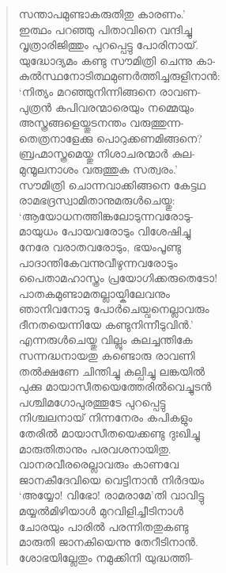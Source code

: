 \begin{verse}
സന്താപമുണ്ടാകരുതിതു കാരണം.’\\
ഇത്ഥം പറഞ്ഞു പിതാവിനെ വന്ദിച്ചു\\
വൃത്രാരിജിത്തും പുറപ്പെട്ടു പോരിനായ്.\\
യുദ്ധോദ്യമം കണ്ടു സൗമിത്രി ചെന്നു കാ-\\
കുല്‍സ്ഥനോടിത്ഥമുണര്‍ത്തിച്ചരുളിനാന്‍:\\
‘നിത്യം മറഞ്ഞുനിന്നിങ്ങനെ രാവണ-\\
പുത്രന്‍ കപിവരന്മാരെയും നമ്മെയും\\
അസ്ത്രങ്ങളെയ്തുടനന്തം വരുത്തുന്ന-\\
തെത്രനാളേക്കു പൊറുക്കണമിങ്ങനെ?\\
ബ്രഹ്മാസ്ത്രമെയ്തു നിശാചരന്മാര്‍ കുല-\\
മുന്മൂലനാശം വരുത്തുക സത്വരം.’\\
സൗമിത്രി ചൊന്നവാക്കിങ്ങനെ കേട്ടഥ\\
രാമഭദ്രസ്വാമിതാനുമരുള്‍ചെയ്തു:\\
‘ആയോധനത്തിങ്കലോടുന്നവരോടു-\\
മായുധം പോയവരോടും വിശേഷിച്ചു\\
നേരേ വരാതവരോടും, ഭയംപൂണ്ടു\\
പാദാന്തികേവന്നുവീഴുന്നവരോടും\\
പൈതാമഹാസ്ത്രം പ്രയോഗിക്കരുതെടോ!\\
പാതകമുണ്ടാമതല്ലായ്കിലേവനും\\
ഞാനിവനോടു പോര്‍ചെയ്വനെല്ലാവരും\\
ദീനതയെന്നിയേ കണ്ടുനിന്നീടുവിന്‍.’\\
എന്നരുള്‍ചെയ്തു വില്ലും കുലച്ചന്തികേ\\
സന്നദ്ധനായതു കണ്ടൊരു രാവണി\\
തല്‍ക്ഷണേ ചിന്തിച്ചു കല്പിച്ചു ലങ്കയില്‍\\
പുക്കു മായാസീതയെത്തേരില്‍വെച്ചുടന്‍\\
പശ്ചിമഗോപുരത്തൂടേ പുറപ്പെട്ടു\\
നിശ്ചലനായ് നിന്നനേരം കപികളും\\
തേരില്‍ മായാസീതയെക്കണ്ടു ദുഃഖിച്ചു\\
മാരുതിതാനും പരവശനായിതു.\\
വാനരവീരരെല്ലാവരും കാണവേ\\
ജാനകീദേവിയെ വെട്ടിനാന്‍ നിര്‍ദയം\\
‘അയ്യോ! വിഭോ! രാമരാമേ’തി വാവിട്ടു\\
മയ്യല്‍മിഴിയാള്‍ മുറവിളിച്ചീടിനാള്‍\\
ചോരയും പാരില്‍ പരന്നിതതുകണ്ടു\\
മാരുതി ജാനകിയെന്നു തേറീടിനാന്‍.\\
ശോഭയില്ലേതും നമുക്കിനി യുദ്ധത്തി-\\

\end{verse}
